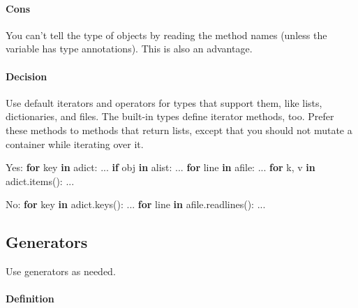 \documentclass[
]{article}
\newenvironment{Shaded}{}{}
\newcommand{\ControlFlowTok}[1]{\textcolor[rgb]{0.00,0.44,0.13}{\textbf{#1}}}
\newcommand{\KeywordTok}[1]{\textcolor[rgb]{0.00,0.44,0.13}{\textbf{#1}}}
\newcommand{\NormalTok}[1]{#1}
\begin{document}
\paragraph{Cons}

You can't tell the type of objects by reading the method names (unless
the variable has type annotations). This is also an advantage.

\paragraph{Decision}

Use default iterators and operators for types that support them, like
lists, dictionaries, and files. The built-in types define iterator
methods, too. Prefer these methods to methods that return lists, except
that you should not mutate a container while iterating over it.

\begin{samepage}
\begin{Shaded}
\begin{Highlighting}[]
\NormalTok{Yes:  }\ControlFlowTok{for}\NormalTok{ key }\KeywordTok{in}\NormalTok{ adict: ...}
      \ControlFlowTok{if}\NormalTok{ obj }\KeywordTok{in}\NormalTok{ alist: ...}
      \ControlFlowTok{for}\NormalTok{ line }\KeywordTok{in}\NormalTok{ afile: ...}
      \ControlFlowTok{for}\NormalTok{ k, v }\KeywordTok{in}\NormalTok{ adict.items(): ...}
\end{Highlighting}
\end{Shaded}
\end{samepage}

\begin{samepage}
\begin{Shaded}
\begin{Highlighting}[]
\NormalTok{No:   }\ControlFlowTok{for}\NormalTok{ key }\KeywordTok{in}\NormalTok{ adict.keys(): ...}
      \ControlFlowTok{for}\NormalTok{ line }\KeywordTok{in}\NormalTok{ afile.readlines(): ...}
\end{Highlighting}
\end{Shaded}
\end{samepage}

\subsection{Generators}

Use generators as needed.

\paragraph{Definition}
\end{document}
